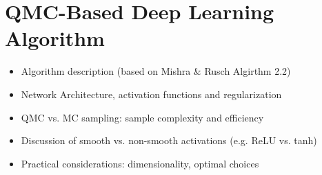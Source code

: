 \chapter{QMC-Based Deep Learning Algorithm}
\label{chapter6}
\begin{itemize}
    \item Algorithm description (based on Mishra \& Rusch Algirthm 2.2)
    \item Network Architecture, activation functions and regularization
    \item QMC vs. MC sampling: sample complexity and efficiency
    \item Discussion of smooth vs. non-smooth activations (e.g. ReLU vs. tanh)
    \item Practical considerations: dimensionality, optimal choices
\end{itemize}